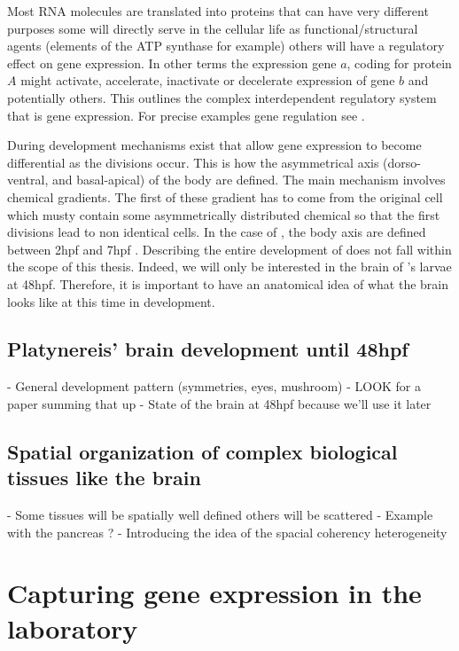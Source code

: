 	Most RNA molecules are translated into proteins that can have very different purposes some will directly serve in the cellular life as functional/structural agents (elements of the ATP synthase for example) others will have a regulatory effect on gene expression. In other terms the expression gene $a$, coding for protein $A$ might activate, accelerate, inactivate or decelerate expression of gene $b$ and potentially others. This outlines the complex interdependent regulatory system that is gene expression. For precise examples gene regulation see \cite{gossen92, shinozaki03,fuqua01,balmer02}.\\
	
	
	During development mechanisms exist that allow gene expression to become differential as the divisions occur. This is how the asymmetrical axis (dorso-ventral, and basal-apical) of the body are defined. The main mechanism involves chemical gradients. The first of these gradient has to come from the original cell which musty contain some asymmetrically distributed chemical so that the first divisions lead to non identical cells. In the case of \platyfull{}, the body axis are defined  between 2hpf and 7hpf \cite{Fischer10}. Describing the entire development of \platy{} does not fall within the scope of this thesis. Indeed, we will only be interested in the brain of \platy{}'s larvae at 48hpf. Therefore, it is important to have an anatomical idea of what the brain looks like at this time in development.
	

     \subsection{Platynereis' brain development until 48hpf}
    - General development pattern (symmetries, eyes, mushroom)
    - LOOK for a paper summing that up
    - State of the brain at 48hpf because we'll use it later

     \subsection{Spatial organization of complex biological tissues like the brain}
    - Some tissues will be spatially well defined others will be scattered
    - Example with the pancreas ?
    - Introducing the idea of the spacial coherency heterogeneity

\section{Capturing gene expression in the laboratory}
